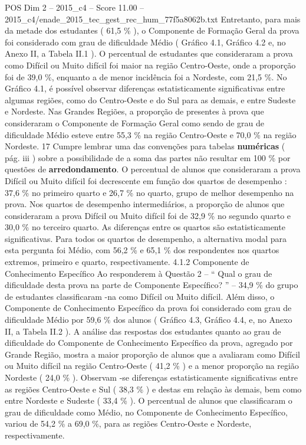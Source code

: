 \begin{textsample}{POS Dim 2 – 2015\_c4 – Score 11.00 – 2015\_c4/enade\_2015\_tec\_gest\_rec\_hum\_77f5a8062b.txt}
Entretanto, para mais da metade dos estudantes ( 61,5 \% ), o Componente de Formação Geral da prova foi considerado com grau de dificuldade Médio ( Gráfico 4.1, Gráfico 4.2 e, no Anexo II, a Tabela II.1 ).
O percentual de estudantes que consideraram a prova como Difícil ou Muito difícil foi maior na região Centro-Oeste, onde a proporção foi de 39,0 \%, enquanto a de menor incidência foi a Nordeste, com 21,5 \%.
No Gráfico 4.1, é possível observar diferenças estatisticamente significativas entre algumas regiões, como do Centro-Oeste e do Sul para as demais, e entre Sudeste e Nordeste.
Nas Grandes Regiões, a proporção de presentes à prova que consideraram o Componente de Formação Geral como sendo de grau de dificuldade Médio esteve entre 55,3 \% na região Centro-Oeste e 70,0 \% na região Nordeste. 17 Cumpre lembrar uma das convenções para tabelas \textbf{numéricas} ( pág. iii ) sobre a possibilidade de a soma das partes não resultar em 100 \% por questões de \textbf{arredondamento}.
O percentual de alunos que consideraram a prova Difícil ou Muito difícil foi decrescente em função dos quartos de desempenho : 37,6 \% no primeiro quarto e 26,7 \% no quarto, grupo de melhor desempenho na prova.
Nos quartos de desempenho intermediários, a proporção de alunos que consideraram a prova Difícil ou Muito difícil foi de 32,9 \% no segundo quarto e 30,0 \% no terceiro quarto.
As diferenças entre os quartos são estatisticamente significativas.
Para todos os quartos de desempenho, a alternativa modal para esta pergunta foi Médio, com 56,2 \% e 65,1 \% dos respondentes nos quartos extremos, primeiro e quarto, respectivamente. 4.1.2 Componente de Conhecimento Específico Ao responderem à Questão 2 – “ Qual o grau de dificuldade desta prova na parte de Componente Específico? ” – 34,9 \% do grupo de estudantes classificaram -na como Difícil ou Muito difícil.
Além disso, o Componente de Conhecimento Específico da prova foi considerado com grau de dificuldade Médio por 59,6 \% dos alunos ( Gráfico 4.3, Gráfico 4.4, e, no Anexo II, a Tabela II.2 ).
A análise das respostas dos estudantes quanto ao grau de dificuldade do Componente de Conhecimento Específico da prova, agregado por Grande Região, mostra a maior proporção de alunos que a avaliaram como Difícil ou Muito difícil na região Centro-Oeste ( 41,2 \% ) e a menor proporção na região Nordeste ( 24,0 \% ).
Observam -se diferenças estatisticamente significativas entre as regiões Centro-Oeste e Sul ( 38,3 \% ) e destas em relação às demais, bem como entre Nordeste e Sudeste ( 33,4 \% ).
O percentual de alunos que classificaram o grau de dificuldade como Médio, no Componente de Conhecimento Específico, variou de 54,2 \% a 69,0 \%, para as regiões Centro-Oeste e Nordeste, respectivamente.

\end{textsample}
